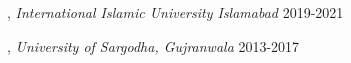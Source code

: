
, \textit{International Islamic University Islamabad}	\hfill 2019-2021

, \textit{University of Sargodha, Gujranwala} \hfill	2013-2017
% 
